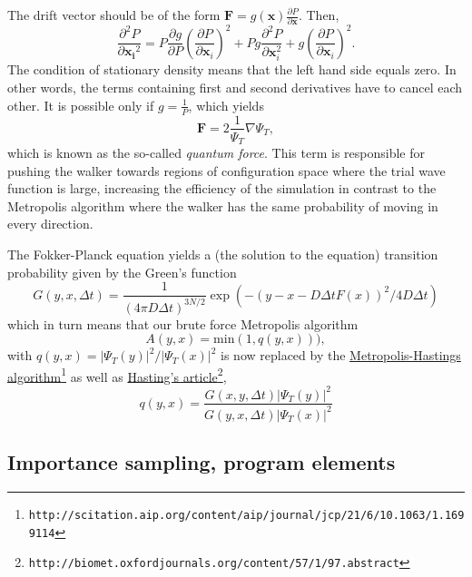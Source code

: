 \documentclass[graybox,sectrefs,envcountresetchap,open=right]{svmonodo}
\begin{document}
The drift vector should be of the form $\mathbf{F} = g(\mathbf{x}) \frac{\partial P}{\partial \mathbf{x}}$. Then,
\[
\frac{\partial^2 P}{\partial {\mathbf{x_i}^2}} = P\frac{\partial g}{\partial P}\left( \frac{\partial P}{\partial {\mathbf{x}_i}}  \right)^2 + P g \frac{\partial ^2 P}{\partial {\mathbf{x}_i^2}}  + g \left( \frac{\partial P}{\partial {\mathbf{x}_i}}  \right)^2.
\]
The condition of stationary density means that the left hand side equals zero. In other words, the terms containing first and second derivatives have to cancel each other. It is possible only if $g = \frac{1}{P}$, which yields
\[
\mathbf{F} = 2\frac{1}{\Psi_T}\nabla\Psi_T,
\]
which is known as the so-called \emph{quantum force}. This term is responsible for pushing the walker towards regions of configuration space where the trial wave function is large, increasing the efficiency of the simulation in contrast to the Metropolis algorithm where the walker has the same probability of moving in every direction.







The Fokker-Planck equation yields a (the solution to the equation) transition probability given by the Green's function
\[
  G(y,x,\Delta t) = \frac{1}{(4\pi D\Delta t)^{3N/2}} \exp{\left(-(y-x-D\Delta t F(x))^2/4D\Delta t\right)}
\]
which in turn means that our brute force Metropolis algorithm
\[ 
    A(y,x) = \mathrm{min}(1,q(y,x))),
\]
with $q(y,x) = |\Psi_T(y)|^2/|\Psi_T(x)|^2$ is now replaced by the \href{{http://scitation.aip.org/content/aip/journal/jcp/21/6/10.1063/1.1699114}}{Metropolis-Hastings algorithm}\footnote{\texttt{http://scitation.aip.org/content/aip/journal/jcp/21/6/10.1063/1.1699114}} as well as \href{{http://biomet.oxfordjournals.org/content/57/1/97.abstract}}{Hasting's article}\footnote{\texttt{http://biomet.oxfordjournals.org/content/57/1/97.abstract}}, 
\[
q(y,x) = \frac{G(x,y,\Delta t)|\Psi_T(y)|^2}{G(y,x,\Delta t)|\Psi_T(x)|^2}
\]




\subsection{Importance sampling, program elements}
\end{document}
